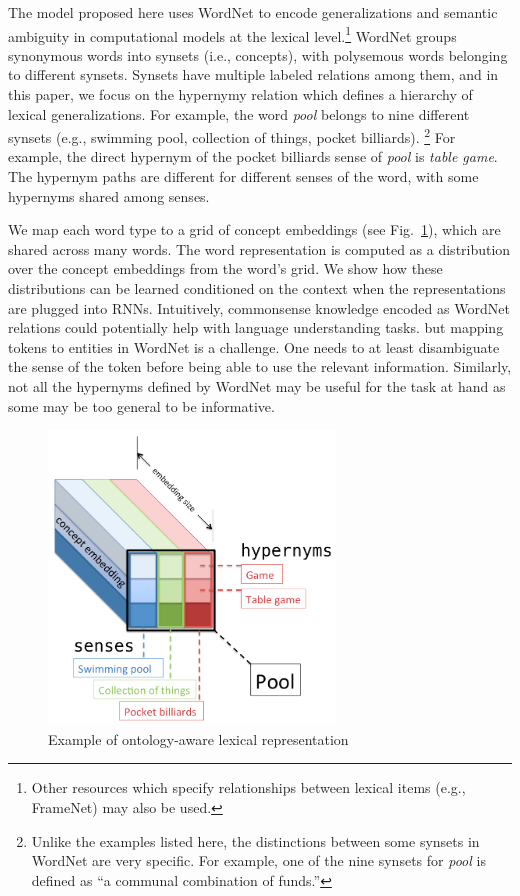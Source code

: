 The model proposed here uses WordNet \citep{miller1995wordnet} to encode generalizations and semantic ambiguity in computational models at the lexical level.\footnote{Other resources which specify relationships between lexical items (e.g., FrameNet) may also be used.}
WordNet groups synonymous words into synsets (i.e., concepts), with polysemous words belonging to different synsets. Synsets have multiple labeled relations among them, and in this paper, we focus on the hypernymy relation which defines a hierarchy of lexical generalizations.
For example, the word \textit{pool} belongs to nine different synsets (e.g., swimming pool, collection of things, pocket billiards).
\footnote{Unlike the examples listed here, the distinctions between some synsets in WordNet are very specific. For example, one of the nine synsets for \textit{pool} is defined as ``a communal combination of funds.''}
For example, the direct hypernym of the pocket billiards sense of \textit{pool} is \textit{table game}.
The hypernym paths are different for different senses of the word, with some hypernyms shared among senses.

We map each word type to a grid of concept embeddings (see Fig.~\ref{fig:ontolstm_tensor}), which are shared across many words. The word representation is computed as a distribution over the concept embeddings from the word's grid. We show how these distributions can be 
learned conditioned on the context when the representations are plugged into RNNs.
Intuitively, commonsense knowledge encoded as WordNet relations could potentially help with language understanding tasks. 
but mapping tokens to entities in WordNet is a challenge. One needs to at least disambiguate the sense of the token before being able to use the relevant information. Similarly, not all the hypernyms defined by WordNet may be useful for the task at hand as some may be too general to be informative.
 
\begin{figure}[t]
\begin{center}
\includegraphics[width=3in]{figures/tensor2.png}
\caption{Example of ontology-aware lexical representation}
\label{fig:ontolstm_tensor}
\end{center}
\end{figure}

